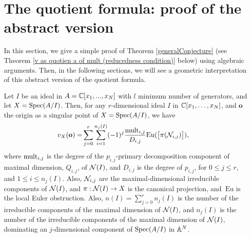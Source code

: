\documentclass[11pt,a4paper,leqno,noamsfonts]{amsart}
\numberwithin{equation}{section}
\begin{document}
\section{The quotient formula: proof of the abstract version}

In this section, we give a simple proof of Theorem \ref{generalConjecture} (see Theorem  \ref{v as quotien a of mult (reducedness condition)} below) using algebraic arguments.
Then, in the following sections, we will see a geometric interpretation of this abstract version of the quotient formula.



\begin{theorem}
 \label{v as quotien a of mult (reducedness condition)}
Let $I$ be an 
ideal in $A={\mathbb{C}}[x_1,...,x_N]$ with $l$ minimum number of generators, and let $X=\operatorname{Spec}(A/I)$. Then,  for any $r$-dimensional ideal $I$ in ${\mathbb{C}}[x_1,\ldots,x_N]$, and $\mathbf{o}$ the origin as a singular point of  $X=\operatorname{Spec}(A/I)$, we have
\begin{align*}
v_X(\mathbf{o})=&\sum_{j=0}^{r}\sum_{i=1}^{n_j(I)}(-1)^j\frac{\mathrm{mult}_{i,j}}{D_{i,j}}\mathrm{Eu}(\big[\pi({\mathcal N}_{i,j})\big]),
\end{align*}
where $\mathrm{mult}_{i,j}$ is the degree of the $p_{i,j}$-primary decomposition component of maximal dimension, $Q_{i,j}$, of ${\mathcal N}(I)$, and $D_{i,j}$ is the degree of $p_{i,j}$, for $0\leq j \leq r$, and $1\leq i \leq n_j(I)$. Also, ${\mathcal N}_{i,j}$ are the maximal-dimensional irreducible components of ${\mathcal N}(I)$, and $\pi:{\mathcal N}(I)\to X$ is the canonical projection, and $\:{}\mathrm{Eu}$ is the local Euler obstruction. Also, $n(I)=\sum_{j=0}^{r}n_j(I)$ is the number of the irreducible components of the maximal dimension of ${\mathcal N}(I)$, and $n_j(I)$ is the number of the irreducible components of the maximal dimension of ${\mathcal N}(I)$, dominating an $j$-dimensional component of $\operatorname{Spec}(A/I)$ in ${\mathbb{A}}^N$. 


\end{theorem}
\end{document}
